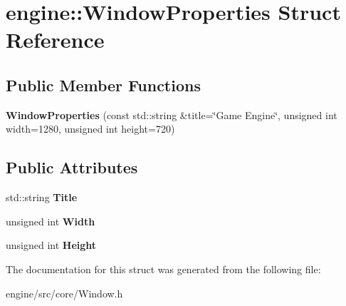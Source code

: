 \hypertarget{structengine_1_1WindowProperties}{}\section{engine\+:\+:Window\+Properties Struct Reference}
\label{structengine_1_1WindowProperties}
\subsection*{Public Member Functions}
\begin{DoxyCompactItemize}
\item 
\mbox{\label{structengine_1_1WindowProperties_a8987e75ecc92e10f6764c0a677839b71}} 
{\bfseries Window\+Properties} (const std\+::string \&title=\char`\"{}Game Engine\char`\"{}, unsigned int width=1280, unsigned int height=720)
\end{DoxyCompactItemize}
\subsection*{Public Attributes}
\begin{DoxyCompactItemize}
\item 
\mbox{\label{structengine_1_1WindowProperties_a900cb8f590d355b520c7f8f4f75ecd99}} 
std\+::string {\bfseries Title}
\item 
\mbox{\label{structengine_1_1WindowProperties_a565d00a868bd2aae0abedb9e0f6faf9e}} 
unsigned int {\bfseries Width}
\item 
\mbox{\label{structengine_1_1WindowProperties_aa88ea216a94e459a14c5e8549c9630ba}} 
unsigned int {\bfseries Height}
\end{DoxyCompactItemize}


The documentation for this struct was generated from the following file\+:\begin{DoxyCompactItemize}
\item 
engine/src/core/Window.\+h\end{DoxyCompactItemize}
